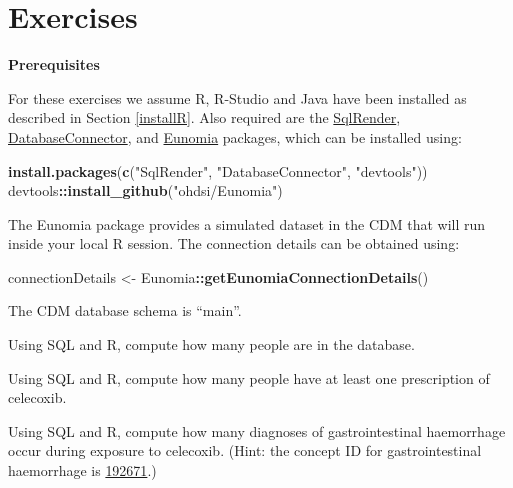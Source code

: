 \documentclass[11pt]{book}
\newenvironment{Shaded}{\begin{snugshade}}{\end{snugshade}}
\newcommand{\KeywordTok}[1]{\textcolor[rgb]{0.13,0.29,0.53}{\textbf{#1}}}
\newcommand{\NormalTok}[1]{#1}
\newcommand{\OperatorTok}[1]{\textcolor[rgb]{0.81,0.36,0.00}{\textbf{#1}}}
\newcommand{\StringTok}[1]{\textcolor[rgb]{0.31,0.60,0.02}{#1}}
\theoremstyle{definition}
\theoremstyle{definition}
\theoremstyle{definition}
\theoremstyle{remark}
\let\BeginKnitrBlock\begin \let\EndKnitrBlock\end
\begin{document}
\hypertarget{exercises-1}{%
\section{Exercises}\label{exercises-1}}

\textbf{Prerequisites}

For these exercises we assume R, R-Studio and Java have been installed as described in Section \ref{installR}. Also required are the \href{https://ohdsi.github.io/SqlRender/}{SqlRender}, \href{https://ohdsi.github.io/DatabaseConnector/}{DatabaseConnector}, and \href{https://ohdsi.github.io/Eunomia/}{Eunomia} packages, which can be installed using:

\begin{Shaded}
\begin{Highlighting}[]
\KeywordTok{install.packages}\NormalTok{(}\KeywordTok{c}\NormalTok{(}\StringTok{"SqlRender"}\NormalTok{, }\StringTok{"DatabaseConnector"}\NormalTok{, }\StringTok{"devtools"}\NormalTok{))}
\NormalTok{devtools}\OperatorTok{::}\KeywordTok{install_github}\NormalTok{(}\StringTok{"ohdsi/Eunomia"}\NormalTok{)}
\end{Highlighting}
\end{Shaded}

The Eunomia package provides a simulated dataset in the CDM that will run inside your local R session. The connection details can be obtained using:

\begin{Shaded}
\begin{Highlighting}[]
\NormalTok{connectionDetails <-}\StringTok{ }\NormalTok{Eunomia}\OperatorTok{::}\KeywordTok{getEunomiaConnectionDetails}\NormalTok{()}
\end{Highlighting}
\end{Shaded}

The CDM database schema is ``main''.

\BeginKnitrBlock{exercise}
\protect\hypertarget{exr:exercisePeopleCount}{}{\label{exr:exercisePeopleCount} }Using SQL and R, compute how many people are in the database.
\EndKnitrBlock{exercise}

\BeginKnitrBlock{exercise}
\protect\hypertarget{exr:exerciseCelecoxibUsers}{}{\label{exr:exerciseCelecoxibUsers} }Using SQL and R, compute how many people have at least one prescription of celecoxib.
\EndKnitrBlock{exercise}

\BeginKnitrBlock{exercise}
\protect\hypertarget{exr:exerciseGiBleedsDuringCelecoxib}{}{\label{exr:exerciseGiBleedsDuringCelecoxib} }Using SQL and R, compute how many diagnoses of gastrointestinal haemorrhage occur during exposure to celecoxib. (Hint: the concept ID for gastrointestinal haemorrhage is \href{http://athena.ohdsi.org/search-terms/terms/192671}{192671}.)
\EndKnitrBlock{exercise}
\end{document}

